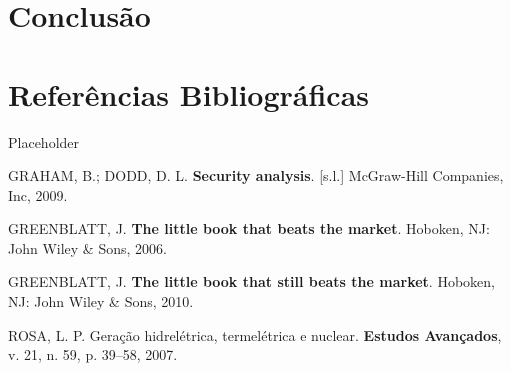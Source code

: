 \documentclass[grad,numbers]{coppe}
\newenvironment{cslreferences}%
  {}%
  {\par}
\begin{document}
  \hypertarget{conclusuxe3o}{%
  \chapter{Conclusão}\label{conclusuxe3o}}

  \hypertarget{referuxeancias-bibliogruxe1ficas}{%
  \chapter*{Referências Bibliográficas}\label{referuxeancias-bibliogruxe1ficas}}

  Placeholder

  \hypertarget{refs}{}
  \begin{cslreferences}
  \leavevmode\hypertarget{ref-graham2009}{}%
  GRAHAM, B.; DODD, D. L. \textbf{Security analysis}. {[}s.l.{]} McGraw-Hill Companies, Inc, 2009.

  \leavevmode\hypertarget{ref-greenblatt2006}{}%
  GREENBLATT, J. \textbf{The little book that beats the market}. Hoboken, NJ: John Wiley \& Sons, 2006.

  \leavevmode\hypertarget{ref-greenblatt2010}{}%
  GREENBLATT, J. \textbf{The little book that still beats the market}. Hoboken, NJ: John Wiley \& Sons, 2010.

  \leavevmode\hypertarget{ref-rosa2007}{}%
  ROSA, L. P. Geração hidrelétrica, termelétrica e nuclear. \textbf{Estudos Avançados}, v. 21, n. 59, p. 39--58, 2007.
  \end{cslreferences}
  \backmatter
  
  

\end{document}
